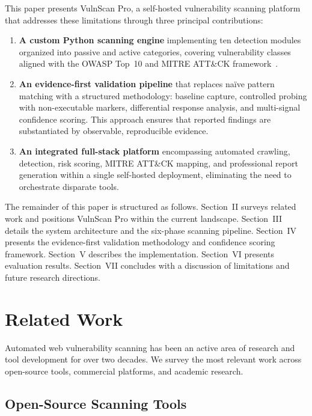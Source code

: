 \documentclass[conference]{IEEEtran}
\begin{document}
This paper presents VulnScan Pro, a self-hosted vulnerability scanning platform that addresses these limitations through three principal contributions:

\begin{enumerate}
    \item \textbf{A custom Python scanning engine} implementing ten detection modules organized into passive and active categories, covering vulnerability classes aligned with the OWASP Top~10 and MITRE ATT\&CK framework~\cite{mitre2024}.
    
    \item \textbf{An evidence-first validation pipeline} that replaces na\"ive pattern matching with a structured methodology: baseline capture, controlled probing with non-executable markers, differential response analysis, and multi-signal confidence scoring. This approach ensures that reported findings are substantiated by observable, reproducible evidence.
    
    \item \textbf{An integrated full-stack platform} encompassing automated crawling, detection, risk scoring, MITRE ATT\&CK mapping, and professional report generation within a single self-hosted deployment, eliminating the need to orchestrate disparate tools.
\end{enumerate}

The remainder of this paper is structured as follows. Section~II surveys related work and positions VulnScan Pro within the current landscape. Section~III details the system architecture and the six-phase scanning pipeline. Section~IV presents the evidence-first validation methodology and confidence scoring framework. Section~V describes the implementation. Section~VI presents evaluation results. Section~VII concludes with a discussion of limitations and future research directions.

\section{Related Work}

Automated web vulnerability scanning has been an active area of research and tool development for over two decades. We survey the most relevant work across open-source tools, commercial platforms, and academic research.

\subsection{Open-Source Scanning Tools}
\end{document}
